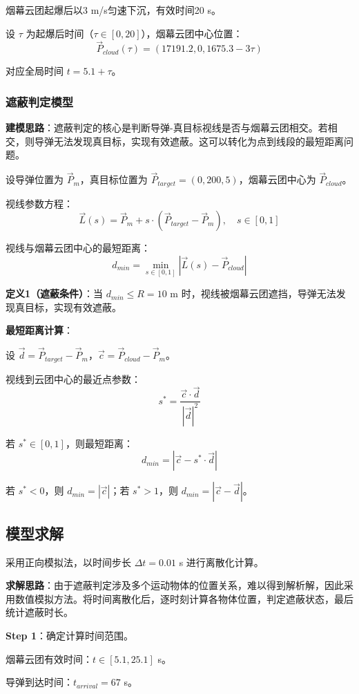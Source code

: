 \documentclass[12pt,a4paper]{article}
\begin{document}
烟幕云团起爆后以3 m/s匀速下沉，有效时间20 s。

设 $\tau$ 为起爆后时间（$\tau \in [0, 20]$），烟幕云团中心位置：
$$\vec{P}_{cloud}(\tau) = (17191.2, 0, 1675.3 - 3\tau)$$

对应全局时间 $t = 5.1 + \tau$。

\subsubsection{遮蔽判定模型}

\textbf{建模思路}：遮蔽判定的核心是判断导弹-真目标视线是否与烟幕云团相交。若相交，则导弹无法发现真目标，实现有效遮蔽。这可以转化为点到线段的最短距离问题。

设导弹位置为 $\vec{P}_m$，真目标位置为 $\vec{P}_{target} = (0, 200, 5)$，烟幕云团中心为 $\vec{P}_{cloud}$。

视线参数方程：
$$\vec{L}(s) = \vec{P}_m + s \cdot (\vec{P}_{target} - \vec{P}_m), \quad s \in [0, 1]$$

视线与烟幕云团中心的最短距离：
$$d_{min} = \min_{s \in [0,1]} |\vec{L}(s) - \vec{P}_{cloud}|$$

\textbf{定义1（遮蔽条件）}：当 $d_{min} \leq R = 10$ m 时，视线被烟幕云团遮挡，导弹无法发现真目标，实现有效遮蔽。

\textbf{最短距离计算}：

设 $\vec{d} = \vec{P}_{target} - \vec{P}_m$，$\vec{c} = \vec{P}_{cloud} - \vec{P}_m$。

视线到云团中心的最近点参数：
$$s^* = \frac{\vec{c} \cdot \vec{d}}{|\vec{d}|^2}$$

若 $s^* \in [0, 1]$，则最短距离：
$$d_{min} = |\vec{c} - s^* \cdot \vec{d}|$$

若 $s^* < 0$，则 $d_{min} = |\vec{c}|$；若 $s^* > 1$，则 $d_{min} = |\vec{c} - \vec{d}|$。

\subsection{模型求解}

采用正向模拟法，以时间步长 $\Delta t = 0.01$ s 进行离散化计算。

\textbf{求解思路}：由于遮蔽判定涉及多个运动物体的位置关系，难以得到解析解，因此采用数值模拟方法。将时间离散化后，逐时刻计算各物体位置，判定遮蔽状态，最后统计遮蔽时长。

\textbf{Step 1}：确定计算时间范围。

烟幕云团有效时间：$t \in [5.1, 25.1]$ s。

导弹到达时间：$t_{arrival} = 67$ s。
\end{document}
